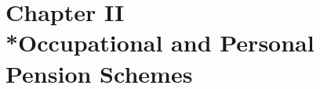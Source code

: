 \documentclass[12pt,a4paper]{article}
\begin{document}
\section[Chapter II --- Occupational and Personal Pension Schemes]{Chapter II\\*Occupational and Personal Pension Schemes}
\renewcommand\parthead{--- Part II Chapter II}

%
%
%
%
%
%
%
%
%
%
%
%
%
%
%
%
%
%
\end{document}
